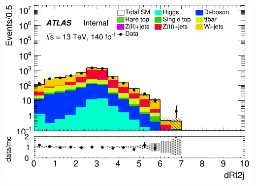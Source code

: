 \documentclass[usenames,dvipsnames]{beamer}
\begin{document}
\begin{frame}
\begin{minipage}{0.32\textwidth}
        \centering
        \includegraphics[width=\textwidth]{graphics/H_met/H_met_dRt2j.png}
    \end{minipage}
    
    \vspace{0.5cm} %


\end{frame}
\end{document}
